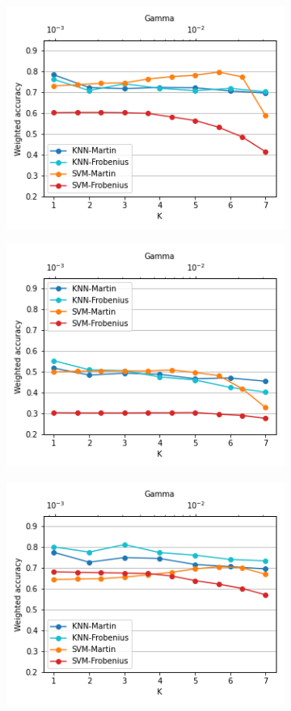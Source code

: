 \documentclass[twocolumn,10pt]{asme2ej}
\begin{document}
\begin{figure}[t]
\begin{subfigure}{0.25\paperwidth}
     \end{subfigure}
     \begin{subfigure}{0.25\paperwidth}
      \centering
      \includegraphics[width=0.25\paperwidth]{evaluation_jigsaws_weighted_accuracy_baseline_Knot_Tying.png}
    \end{subfigure}%
    \begin{subfigure}{0.25\paperwidth}
      \centering
      \includegraphics[width=0.25\paperwidth]{evaluation_jigsaws_weighted_accuracy_baseline_Needle_Passing.png}
    \end{subfigure}%
    \begin{subfigure}{0.25\paperwidth}
      \centering
      \includegraphics[width=0.25\paperwidth]{evaluation_jigsaws_weighted_accuracy_baseline_Suturing.png}

\end{subfigure}
\end{figure}
\end{document}
